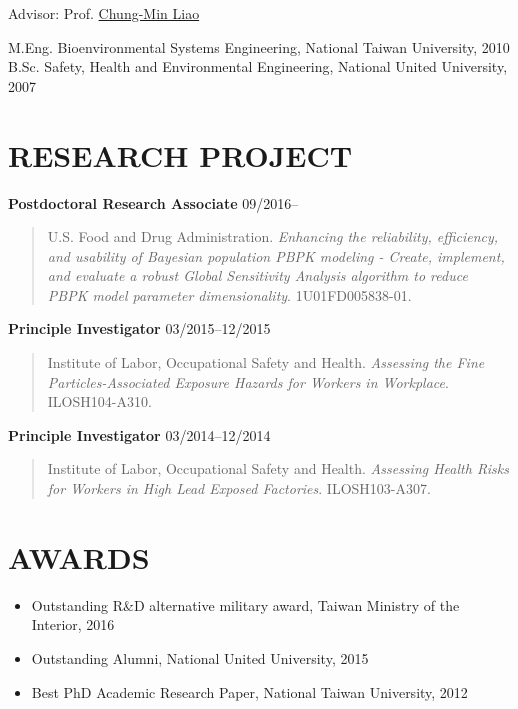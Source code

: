 \documentclass[10pt,]{article}
\providecommand{\tightlist}{%
  \setlength{\itemsep}{0pt}\setlength{\parskip}{0pt}}
\begin{document}
\hfill Advisor: Prof.
\href{http://homepage.ntu.edu.tw/~cmliao/}{Chung-Min Liao}

M.Eng. Bioenvironmental Systems Engineering, National Taiwan University,
2010\\
B.Sc. Safety, Health and Environmental Engineering, National United
University, 2007

\section{RESEARCH PROJECT}\label{research-project}

\textbf{Postdoctoral Research Associate} \hfill 09/2016--

\begin{quote}
U.S. Food and Drug Administration. \emph{Enhancing the reliability,
efficiency, and usability of Bayesian population PBPK modeling - Create,
implement, and evaluate a robust Global Sensitivity Analysis algorithm
to reduce PBPK model parameter dimensionality}. 1U01FD005838-01.
\end{quote}

\textbf{Principle Investigator} \hfill 03/2015--12/2015

\begin{quote}
Institute of Labor, Occupational Safety and Health. \emph{Assessing the
Fine Particles-Associated Exposure Hazards for Workers in Workplace}.
ILOSH104-A310.
\end{quote}

\textbf{Principle Investigator} \hfill 03/2014--12/2014

\begin{quote}
Institute of Labor, Occupational Safety and Health. \emph{Assessing
Health Risks for Workers in High Lead Exposed Factories}. ILOSH103-A307.
\end{quote}

\section{AWARDS}\label{awards}

\begin{itemize}
\tightlist
\item
  Outstanding R\&D alternative military award, Taiwan Ministry of the
  Interior, 2016
\item
  Outstanding Alumni, National United University, 2015
\item
  Best PhD Academic Research Paper, National Taiwan University, 2012
\end{itemize}
\end{document}
